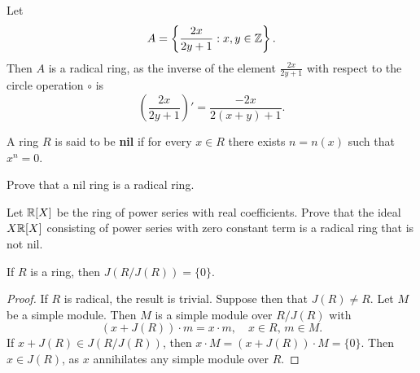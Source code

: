 \begin{example}
	Let 
	\[
	A=\left\{\frac{2x}{2y+1}:x,y\in\mathbb{Z}\right\}.
	\]
	Then $A$ is a radical ring, as the inverse of the element $\frac{2x}{2y+1}$
	with respect to the circle operation 
	$\circ$ is 
	\[
	\left(\frac{2x}{2y+1}\right)'=\frac{-2x}{2(x+y)+1}.
	\]
\end{example}

\begin{definition}
A ring $R$ is said to be \textbf{nil} if for every $x\in R$ there
exists $n=n(x)$ such that $x^n=0$. 
\end{definition}

\begin{exercise}
    Prove that a nil ring is a radical ring. 
\end{exercise}

\begin{exercise}
    Let $\mathbb{R}[X]$ be the ring of power series with real coefficients. Prove that the ideal 
    $X\mathbb{R}[X]$ consisting of power series with zero constant term is a radical ring
    that is not nil. 
\end{exercise}

\begin{theorem}
	\label{thm:J(R/J)=0}
	If $R$ is a ring, then $J(R/J(R))=\{0\}$.
\end{theorem}

\begin{proof}
	If $R$ is radical, the result is trivial. Suppose then that 
	$J(R)\ne R$. Let $M$ be a simple module. Then $M$ is 
	a simple module over $R/J(R)$ with 
	\[
		(x+J(R))\cdot m=x\cdot m,\quad
		x\in R,\,m\in M.
	\]
	If $x+J(R)\in J(R/J(R))$, then  $x\cdot M=(x+J(R))\cdot M=\{0\}$. Then $x\in J(R)$, as 
	$x$ annihilates any simple module over $R$.
\end{proof}

